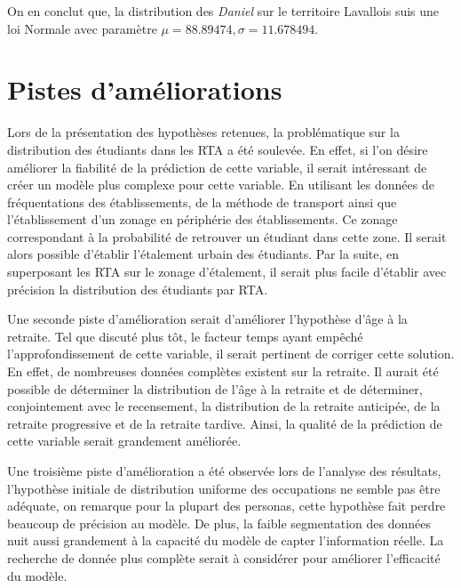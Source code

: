 \documentclass[11pt,french]{article}\usepackage[]{graphicx}\usepackage[]{color}
\begin{document}
On en conclut que, la distribution des \emph{Daniel} sur le territoire Lavallois suis une loi Normale avec paramètre $\mu = 88.89474, \sigma = 11.678494$.

\section{Pistes d'améliorations}

Lors de la présentation des hypothèses retenues, la problématique sur la distribution des étudiants dans les RTA a été soulevée. En effet, si l'on désire améliorer la fiabilité de la prédiction de cette variable, il serait intéressant de créer un modèle plus complexe pour cette variable. En utilisant les données de fréquentations des établissements, de la méthode de transport ainsi que l'établissement d'un zonage en périphérie des établissements. Ce zonage correspondant à la probabilité de retrouver un étudiant dans cette zone. Il serait alors possible d'établir l'étalement urbain des étudiants. Par la suite, en superposant les RTA sur le zonage d'étalement, il serait plus facile d'établir avec précision la distribution des étudiants par RTA. 
\newline

Une seconde piste d'amélioration serait d'améliorer l'hypothèse d'âge à la retraite. Tel que discuté plus tôt, le facteur temps ayant empêché l'approfondissement de cette variable, il serait pertinent de corriger cette solution. En effet, de nombreuses données complètes existent sur la retraite. Il aurait été possible de déterminer la distribution de l'âge à la retraite et de déterminer, conjointement avec le recensement, la distribution de la retraite anticipée, de la retraite progressive et de la retraite tardive. Ainsi, la qualité de la prédiction de cette variable serait grandement améliorée.
\newline

Une troisième piste d'amélioration a été observée lors de l'analyse des résultats, l'hypothèse initiale de distribution uniforme des occupations ne semble pas être adéquate, on remarque pour la plupart des personas, cette hypothèse fait perdre beaucoup de précision au modèle. De plus, la faible segmentation des données nuit aussi grandement à la capacité du modèle de capter l'information réelle. La recherche de donnée plus complète serait à considérer pour améliorer l'efficacité du modèle.
\newline
\end{document}
